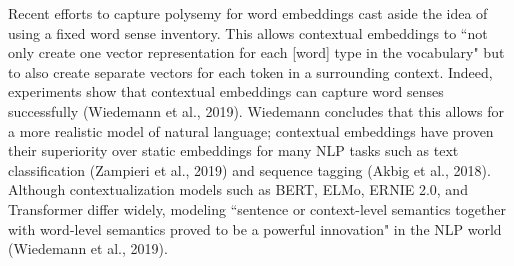 Recent efforts to capture polysemy for word embeddings cast aside the idea of using a fixed word sense inventory. This allows contextual embeddings to ``not only create one vector representation for each [word] type in the vocabulary" but to also create separate vectors for each token in a surrounding context. Indeed, experiments show that contextual embeddings can capture word senses successfully (Wiedemann et al., 2019). Wiedemann concludes that this allows for a more realistic model of natural language; contextual embeddings have proven their superiority over static embeddings for many NLP tasks such as text classification (Zampieri et al., 2019) and sequence tagging (Akbig et al., 2018). Although contextualization models such as BERT, ELMo, ERNIE 2.0, and Transformer differ widely, modeling ``sentence or context-level semantics together with word-level semantics proved to be a powerful innovation" in the NLP world (Wiedemann et al., 2019). 


